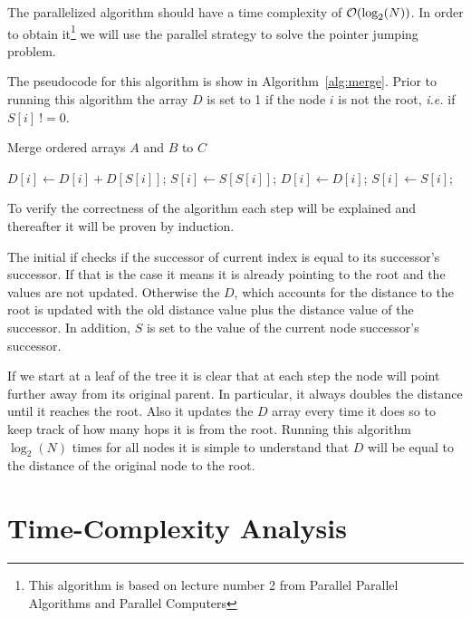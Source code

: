 The parallelized algorithm should have a time complexity of $\mathcal{O}(\log_2(N))$. In order to obtain it\footnote{This algorithm is based on lecture number 2 from Parallel Parallel Algorithms and
Parallel Computers} we will use the parallel strategy to solve the pointer jumping problem.

The pseudocode for this algorithm is show in Algorithm~\ref{alg:merge}. 
Prior to running this algorithm the array $D$ is set to 1 if the node $i$ is not the root, \emph{i.e.} if $S[i]~!= 0$. 


\begin{algorithm}[ht]
\caption{Merge ordered arrays $A$ and $B$ to $C$}
\label{alg:merge}
\begin{algorithmic}[1]
	\renewcommand{\algorithmicdo}{\textbf{pardo}}
			\STATE $D[i] \leftarrow D[i] + D[S[i]]$;
			\STATE $S[i] \leftarrow S[S[i]]$;
		\ELSE
			\STATE $D[i] \leftarrow D[i]$;
			\STATE $S[i] \leftarrow S[i]$;
		\ENDIF
	\ENDFOR
\end{algorithmic}
\end{algorithm}


To verify the correctness of the algorithm each step will be explained and thereafter it will be proven by induction.

The initial if checks if the successor of current index is equal to its successor's successor. If that is the case it means it is already pointing to the root and the values are not updated.
Otherwise the $D$, which accounts for the distance to the root is updated with the old distance value plus the distance value of the successor.
In addition, $S$ is set to the value of the  current node successor's successor.

If we start at a leaf of the tree it is clear that at each step the node will point further away from its original parent. In particular, it always doubles the distance until it reaches the root. Also it updates the $D$ array every time it does so to keep track of how many hops it is from the root. Running this algorithm $\log_2(N)$ times for all nodes it is simple to understand that $D$ will be equal to the distance of the original node to the root.

\section{Time-Complexity Analysis}

